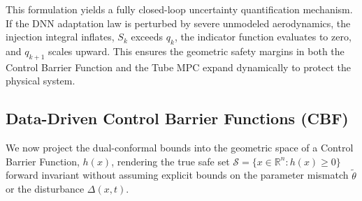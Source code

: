 \documentclass[letterpaper, 10 pt, conference]{ieeeconf}  %
\begin{document}
This formulation yields a fully closed-loop uncertainty quantification mechanism. If the DNN adaptation law is perturbed by severe unmodeled aerodynamics, the injection integral inflates, $S_k$ exceeds $q_k$, the indicator function evaluates to zero, and $q_{k+1}$ scales upward. This ensures the geometric safety margins in both the Control Barrier Function and the Tube MPC expand dynamically to protect the physical system.

\subsection{Data-Driven Control Barrier Functions (CBF)}

We now project the dual-conformal bounds into the geometric space of a Control Barrier Function, $h(x)$, rendering the true safe set $\mathcal{S} = \{x \in \mathbb{R}^n : h(x) \ge 0\}$ forward invariant without assuming explicit bounds on the parameter mismatch $\tilde{\theta}$ or the disturbance $\Delta(x,t)$.
\end{document}
